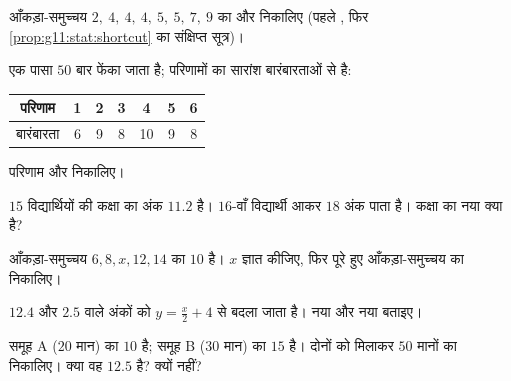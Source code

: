 \begin{exercise}[$\star$]\label{exo:g11:stat:2}
आँकड़ा-समुच्चय $2,\ 4,\ 4,\ 4,\ 5,\ 5,\ 7,\ 9$ का  और  निकालिए (पहले , फिर \cref{prop:g11:stat:shortcut}
का संक्षिप्त सूत्र)।
\end{exercise}

\begin{exercise}[$\star$]\label{exo:g11:stat:3}
एक पासा $50$ बार फेंका जाता है; परिणामों का सारांश बारंबारताओं से है:
\begin{center}
\begin{tabular}{c|cccccc}
परिणाम & 1 & 2 & 3 & 4 & 5 & 6\\
\hline
बारंबारता & 6 & 9 & 8 & 10 & 9 & 8
\end{tabular}
\end{center}
 परिणाम और  निकालिए।
\end{exercise}

\begin{exercise}[$\star\star$]\label{exo:g11:stat:4}
$15$ विद्यार्थियों की कक्षा का  अंक $11.2$ है। $16$-वाँ विद्यार्थी
आकर $18$ अंक पाता है। कक्षा का नया  क्या है?
\end{exercise}

\begin{exercise}[$\star\star$]\label{exo:g11:stat:5}
आँकड़ा-समुच्चय $6, 8, x, 12, 14$ का  $10$ है। $x$ ज्ञात कीजिए, फिर पूरे हुए
आँकड़ा-समुच्चय का  निकालिए।
\end{exercise}

\begin{exercise}[$\star$]\label{exo:g11:stat:6}
 $12.4$ और  $2.5$ वाले अंकों को $y = \frac{x}{2} + 4$ से बदला जाता है। नया
 और नया  बताइए।
\end{exercise}

\begin{exercise}[$\star\star$]\label{exo:g11:stat:7}
समूह A ($20$ मान) का  $10$ है; समूह B ($30$ मान) का  $15$ है।
दोनों को मिलाकर $50$ मानों का  निकालिए। क्या वह  $12.5$ है?
क्यों नहीं?
\end{exercise}

